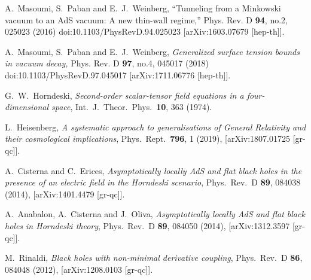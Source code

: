 \documentclass[aps,12pt, a4paper,nofootinbib]{revtex4}
\begin{document}
{\begin{thebibliography}{99}


A.~Masoumi, S.~Paban and E.~J.~Weinberg,
``Tunneling from a Minkowski vacuum to an AdS vacuum: A new thin-wall regime,''
Phys. Rev. D \textbf{94}, no.2, 025023 (2016)
doi:10.1103/PhysRevD.94.025023
[arXiv:1603.07679 [hep-th]].


A.~Masoumi, S.~Paban and E.~J.~Weinberg,
{\it Generalized surface tension bounds in vacuum decay,}
Phys. Rev. D \textbf{97}, no.4, 045017 (2018)
doi:10.1103/PhysRevD.97.045017
[arXiv:1711.06776 [hep-th]].


G.~W.~Horndeski,
{\it Second-order scalar-tensor field equations in a four-dimensional space},
Int.\ J.\ Theor.\ Phys.\  {\bf 10}, 363 (1974).
		
  L.~Heisenberg,
  {\it A systematic approach to generalisations of General Relativity and their cosmological implications},
  Phys.\ Rept.\  {\bf 796}, 1 (2019),
  [arXiv:1807.01725 [gr-qc]].

A.~Cisterna and C.~Erices,
{\it Asymptotically locally AdS and flat black holes in the presence of an electric field in the Horndeski scenario},
Phys.\ Rev.\ D {\bf 89}, 084038 (2014),
[arXiv:1401.4479 [gr-qc]].

A.~Anabalon, A.~Cisterna and J.~Oliva,
{\it Asymptotically locally AdS and flat black holes in Horndeski theory},
Phys.\ Rev.\ D {\bf 89}, 084050 (2014),
[arXiv:1312.3597 [gr-qc]].
	
  M.~Rinaldi,
  {\it Black holes with non-minimal derivative coupling},
  Phys.\ Rev.\ D {\bf 86}, 084048 (2012),
  [arXiv:1208.0103 [gr-qc]].
		

\end{thebibliography}}
\end{document}
